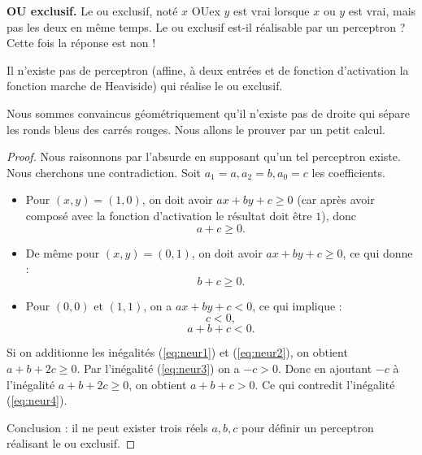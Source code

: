 \documentclass[11pt,class=report,crop=false]{standalone}
\begin{document}
\bigskip
\textbf{OU exclusif.}
Le ou exclusif, noté \og{}$x$ OUex $y$\fg{} est vrai lorsque $x$ ou $y$ est vrai, mais pas les deux en même temps. Le ou exclusif est-il réalisable par un perceptron ? Cette fois la réponse est non !



\begin{proposition}
Il n'existe pas de perceptron (affine, à deux entrées et de fonction d'activation la fonction marche de Heaviside) qui réalise le \og{}ou exclusif\fg{}.
\end{proposition}

Nous sommes convaincus géométriquement qu'il n'existe pas de droite qui sépare les ronds bleus des carrés rouges. Nous allons le prouver par un petit calcul.

\begin{proof}
Nous raisonnons par l'absurde en supposant qu'un tel perceptron existe. Nous cherchons une contradiction. 
Soit $a_1=a,a_2=b,a_0=c$ les coefficients.

\begin{center}
\begin{minipage}{0.35\textwidth}
\end{minipage}
\begin{minipage}{0.45\textwidth}
\end{minipage}
\end{center}

\begin{itemize}
  \item Pour $(x,y)=(1,0)$, on doit avoir $ax+by+c\ge0$ (car après avoir composé avec la fonction d'activation le résultat doit être $1$), 
  donc 
  \begin{equation}
  \label{eq:neur1}
  a+c \ge 0.
  \end{equation}
  \item De même pour $(x,y)=(0,1)$, on doit avoir $ax+by+c\ge0$, ce qui donne :
  \begin{equation}
  \label{eq:neur2}
  b+c \ge 0.
  \end{equation}
  \item Pour $(0,0)$ et $(1,1)$, on a $ax+by+c<0$, ce qui implique :
  \begin{equation}
  \label{eq:neur3}
  c<0,
  \end{equation}  
  \begin{equation}
  \label{eq:neur4}
  a+b+c<0.
  \end{equation}
\end{itemize}

Si on additionne les inégalités (\ref{eq:neur1}) et (\ref{eq:neur2}), on obtient $a+b+2c\ge0$. Par l'inégalité (\ref{eq:neur3}) on a $-c>0$. Donc en ajoutant $-c$ à l'inégalité $a+b+2c\ge0$, on obtient $a+b+c>0$. Ce qui contredit l'inégalité  (\ref{eq:neur4}).

Conclusion : il ne peut exister trois réels $a,b,c$ pour définir un perceptron réalisant le \og{}ou exclusif\fg{}.

\end{proof}
\end{document}
